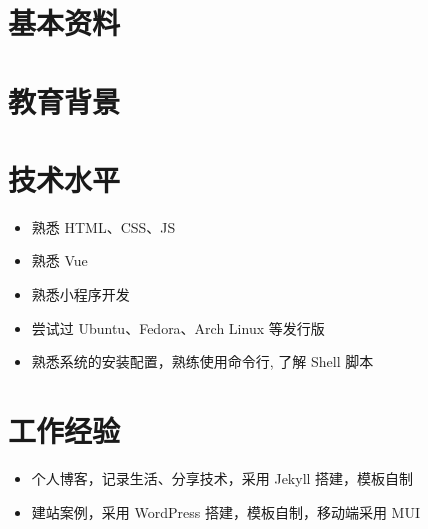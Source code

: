 \documentclass[12pt,a4paper]{moderncv}
\begin{document}
\maketitle

\section{\textbf {基本资料}}


\section{\textbf {教育背景}}


\section{\textbf {技术水平}}

  {  
    \begin{itemize}
    \item \small 熟悉 HTML、CSS、JS
    \item \small 熟悉 Vue
    \item \small 熟悉小程序开发
    \end{itemize}
  }

  {  
    \begin{itemize}
    \item \small 尝试过 Ubuntu、Fedora、Arch Linux 等发行版
    \item \small 熟悉系统的安装配置，熟练使用命令行, 了解 Shell 脚本
    \end{itemize}
  }

\section{\textbf {工作经验}}

  {  
    \begin{itemize}
    \item \small {} 个人博客，记录生活、分享技术，采用 Jekyll 搭建，模板自制
    \item \small {} 建站案例，采用 WordPress 搭建，模板自制，移动端采用 MUI
    \end{itemize}
  }
\end{document}
